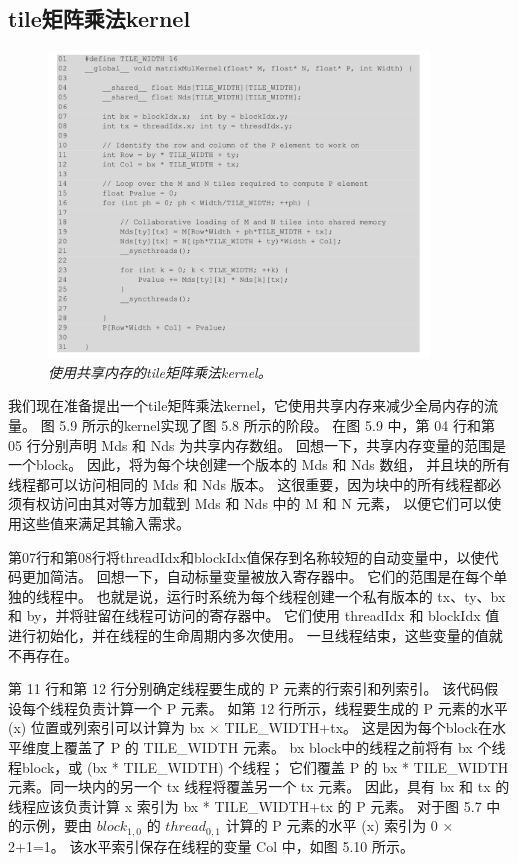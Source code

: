 \subsection{tile矩阵乘法kernel}
\begin{figure}[H]
	\centering
	\includegraphics[width=0.9\textwidth]{figs/F5.9.png}
	\caption{\textit{使用共享内存的tile矩阵乘法kernel。}}
\end{figure}

我们现在准备提出一个tile矩阵乘法kernel，它使用共享内存来减少全局内存的流量。 
图 5.9 所示的kernel实现了图 5.8 所示的阶段。 在图 5.9 中，第 04 行和第 05 行分别声明 Mds 和 Nds 为共享内存数组。 
回想一下，共享内存变量的范围是一个block。 因此，将为每个块创建一个版本的 Mds 和 Nds 数组，
并且块的所有线程都可以访问相同的 Mds 和 Nds 版本。 
这很重要，因为块中的所有线程都必须有权访问由其对等方加载到 Mds 和 Nds 中的 M 和 N 元素，
以便它们可以使用这些值来满足其输入需求。

第07行和第08行将threadIdx和blockIdx值保存到名称较短的自动变量中，以使代码更加简洁。 
回想一下，自动标量变量被放入寄存器中。 它们的范围是在每个单独的线程中。 
也就是说，运行时系统为每个线程创建一个私有版本的 tx、ty、bx 和 by，并将驻留在线程可访问的寄存器中。 
它们使用 threadIdx 和 blockIdx 值进行初始化，并在线程的生命周期内多次使用。 一旦线程结束，这些变量的值就不再存在。

第 11 行和第 12 行分别确定线程要生成的 P 元素的行索引和列索引。 该代码假设每个线程负责计算一个 P 元素。 
如第 12 行所示，线程要生成的 P 元素的水平 (x) 位置或列索引可以计算为 bx × TILE\_WIDTH+tx。 
这是因为每个block在水平维度上覆盖了 P 的 TILE\_WIDTH 元素。 
bx block中的线程之前将有 bx 个线程block，或 (bx * TILE\_WIDTH) 个线程； 
它们覆盖 P 的 bx * TILE\_WIDTH 元素。同一块内的另一个 tx 线程将覆盖另一个 tx 元素。 
因此，具有 bx 和 tx 的线程应该负责计算 x 索引为 bx * TILE\_WIDTH+tx 的 P 元素。 
对于图 5.7 中的示例，要由 $block_{1,0}$ 的 $thread_{0,1}$ 计算的 P 元素的水平 (x) 索引为 0 × 2+1=1。 
该水平索引保存在线程的变量 Col 中，如图 5.10 所示。

